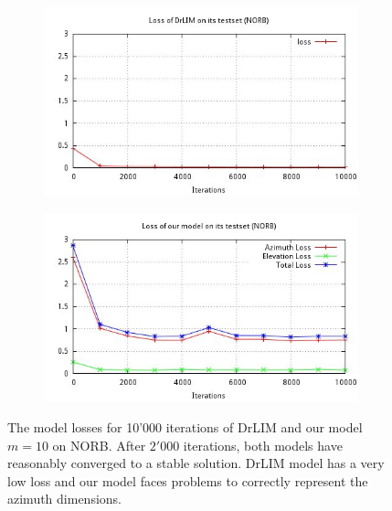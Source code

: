 \documentclass[a4paper,12pt]{report}
\begin{document}
\begin{figure}[h]
    \centering
    \begin{subfigure}{0.45\textwidth}
        \centering
        \includegraphics[width=\textwidth]{thesis_figures/final_loss_testset_3d.jpg}
    \end{subfigure}
    \begin{subfigure}{0.45\textwidth}
        \centering
        \includegraphics[width=\textwidth]{thesis_figures/final_loss_testset_2D1g2.jpg}
    \end{subfigure}
    \caption{The model losses for 10'000 iterations of DrLIM and our model $m=10$ on NORB.
    After $2'000$ iterations, both models have reasonably converged to a stable solution.
    DrLIM model has a very low loss and our model faces problems to correctly represent the azimuth dimensions.
    }
    \label{fig:norb_cl2d_loss}
\end{figure}
\end{document}
